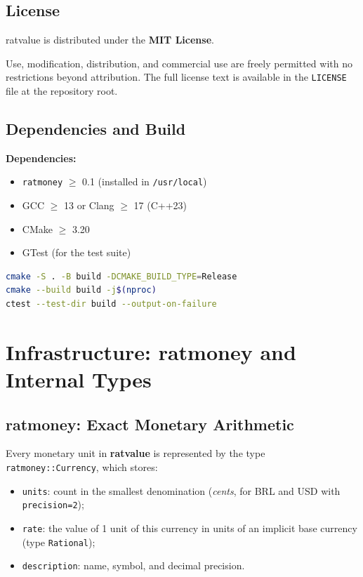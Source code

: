 \documentclass[12pt, a4paper, oneside]{book}
\begin{document}
\section{License}

ratvalue is distributed under the \textbf{MIT License}.

Use, modification, distribution, and commercial use are freely permitted
with no restrictions beyond attribution. The full license text is available
in the \texttt{LICENSE} file at the repository root.

\section{Dependencies and Build}

\textbf{Dependencies:}
\begin{itemize}
  \item \texttt{ratmoney} $\geq$ 0.1 (installed in \texttt{/usr/local})
  \item GCC $\geq$ 13 or Clang $\geq$ 17 (C++23)
  \item CMake $\geq$ 3.20
  \item GTest (for the test suite)
\end{itemize}

\begin{lstlisting}[style=cpp, language=bash, numbers=none,
                   caption={Build and test}]
cmake -S . -B build -DCMAKE_BUILD_TYPE=Release
cmake --build build -j$(nproc)
ctest --test-dir build --output-on-failure
\end{lstlisting}

\chapter{Infrastructure: ratmoney and Internal Types}

\section{ratmoney: Exact Monetary Arithmetic}

Every monetary unit in \textbf{ratvalue} is represented by the type
\texttt{ratmoney::Currency}, which stores:

\begin{itemize}
  \item \texttt{units}: count in the smallest denomination (\emph{cents},
        for BRL and USD with \texttt{precision=2});
  \item \texttt{rate}: the value of 1 unit of this currency in units of an
        implicit base currency (type \texttt{Rational});
  \item \texttt{description}: name, symbol, and decimal precision.
\end{itemize}
\end{document}
